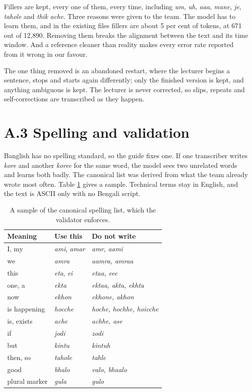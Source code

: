 Fillers are kept, every one of them, every time, including \textit{um}, \textit{uh},
\textit{aaa}, \textit{mane}, \textit{je}, \textit{tahole} and \textit{thik ache}. Three
reasons were given to the team. The model has to learn them, and in the existing files
fillers are about 5 per cent of tokens, at 671 out of 12,890. Removing them breaks the
alignment between the text and its time window. And a reference cleaner than reality makes
every error rate reported from it wrong in our favour.

The one thing removed is an abandoned restart, where the lecturer begins a sentence, stops
and starts again differently; only the finished version is kept, and anything ambiguous is
kept. The lecturer is never corrected, so slips, repeats and self-corrections are
transcribed as they happen.

\section*{A.3 Spelling and validation}

Banglish has no spelling standard, so the guide fixes one. If one transcriber writes
\textit{kore} and another \textit{koree} for the same word, the model sees two unrelated
words and learns both badly. The canonical list was derived from what the team already
wrote most often. Table \ref{tab:spellinglist} gives a sample. Technical terms stay in
English, and the text is ASCII only with no Bengali script.

\begin{table}[htbp]
\centering
\caption{A sample of the canonical spelling list, which the validator enforces.}
\label{tab:spellinglist}
\small
\begin{tabular}{p{3.6cm}p{2.8cm}p{4.4cm}}
\toprule
Meaning & Use this & Do not write \\
\midrule
I, my & \textit{ami}, \textit{amar} & \textit{amr, aami} \\
we & \textit{amra} & \textit{aamra, amraa} \\
this & \textit{eta}, \textit{ei} & \textit{etaa, eee} \\
one, a & \textit{ekta} & \textit{ektaa, akta, ekhta} \\
now & \textit{ekhon} & \textit{ekhone, akhon} \\
is happening & \textit{hocche} & \textit{hoche, hochhe, hoicche} \\
is, exists & \textit{ache} & \textit{achhe, ase} \\
if & \textit{jodi} & \textit{zodi} \\
but & \textit{kintu} & \textit{kintuh} \\
then, so & \textit{tahole} & \textit{tahle} \\
good & \textit{bhalo} & \textit{valo, bhaalo} \\
plural marker & \textit{gula} & \textit{gulo} \\
\bottomrule
\end{tabular}
\end{table}

